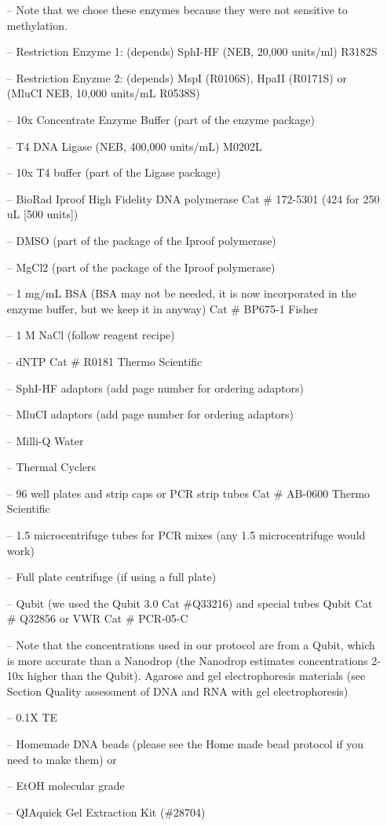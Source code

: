 \documentclass[11pt, oneside]{article}
\begin{document}
		\begin{itemize}[leftmargin=0.5in]
			\item[--] Note that we chose these enzymes because they were not sensitive to methylation.
			\item[--] Restriction Enzyme 1: (depends) SphI-HF (NEB, 20,000 units/ml) R3182S 
			\item[--] Restriction Enyzme 2: (depends) MspI (R0106S), HpaII (R0171S) or (MluCI NEB, 10,000 units/mL R0538S)
			\item[--] 10x Concentrate Enzyme Buffer (part of the enzyme package)
			\item[--] T4 DNA Ligase (NEB, 400,000 units/mL) M0202L 
			\item[--] 10x T4 buffer (part of the Ligase package)
			\item[--] BioRad Iproof High Fidelity DNA polymerase Cat \# 172-5301 (424 for 250 uL [500 units])
			\item[--] DMSO (part of the package of the Iproof polymerase)
			\item[--] MgCl2 (part of the package of the Iproof polymerase)
			\item[--] 1 mg/mL BSA (BSA may not be needed, it is now incorporated in the enzyme buffer, but we keep it in anyway) Cat \# BP675-1 				Fisher  
			\item[--] 1 M NaCl (follow reagent recipe)
			\item[--] dNTP Cat \# R0181 Thermo Scientific
			\item[--] SphI-HF adaptors (add page number for ordering adaptors) 
			\item[--] MluCI adaptors (add page number for ordering adaptors)
			\item[--] Milli-Q Water
			\item[--] Thermal Cyclers 
			\item[--] 96 well plates and strip caps or PCR strip tubes Cat \# AB-0600 Thermo Scientific
			\item[--] 1.5 microcentrifuge tubes for PCR mixes (any 1.5 microcentrifuge would work)
			\item[--] Full plate centrifuge (if using a full plate)
			\item[--] Qubit (we used the Qubit 3.0 Cat \#Q33216) and special tubes Qubit Cat \# Q32856 or VWR Cat \# PCR-05-C
			\item[--] Note that the concentrations used in our protocol are from a Qubit, which is more accurate than a Nanodrop (the Nanodrop estimates concentrations 2-10x higher than the Qubit).
			Agarose and gel electrophoresis materials (see Section Quality assessment of DNA and RNA with gel electrophoresis)
			\item[--] 0.1X TE
			\item[--] Homemade DNA beads (please see the Home made bead protocol if you need to make them) or 
			\item[--] EtOH molecular grade
			\item[--] QIAquick Gel Extraction Kit (\#28704)
		\end{itemize}
\end{document}
